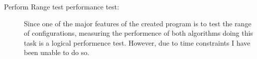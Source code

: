\begin{description}
\item[Perform Range test performance test:] Since one of the major features of the created program is to test the range of configurations, measuring the performence of both algorithms doing this task is a logical performence test. However, due to time constraints I have been unable to do so.
\end{description}
